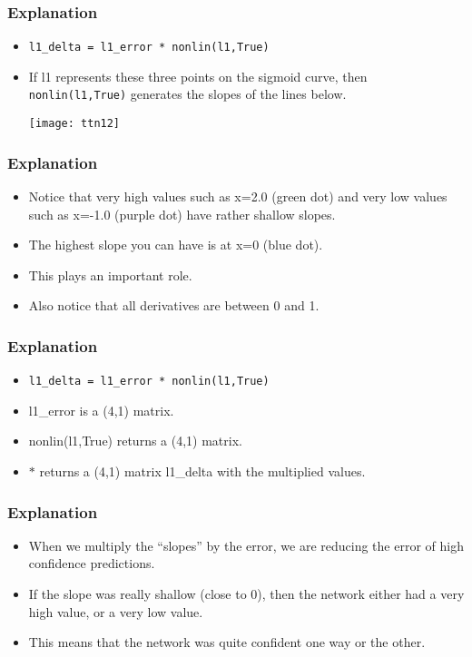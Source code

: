 \begin{frame}[fragile] \frametitle{Explanation}

\begin{itemize}
\item \lstinline|l1_delta = l1_error * nonlin(l1,True)|
\item If l1 represents these three points on the sigmoid curve, then \lstinline|nonlin(l1,True)| generates the slopes of the lines below.
\begin{center}
\texttt{[image: ttn12]}
\end{center}
\end{itemize}
\end{frame}

\begin{frame}[fragile] \frametitle{Explanation}

\begin{itemize}
\item Notice that very high values such as x=2.0 (green dot) and very low values such as x=-1.0 (purple dot) have rather shallow slopes.
\item The highest slope you can have is at x=0 (blue dot). 
\item This plays an important role. 
\item Also notice that all derivatives are between 0 and 1. 
\end{itemize}
\end{frame}

\begin{frame}[fragile] \frametitle{Explanation}

\begin{itemize}
\item \lstinline|l1_delta = l1_error * nonlin(l1,True)|
\item  l1\_error is a (4,1) matrix.
\item nonlin(l1,True) returns a (4,1) matrix. 
\item $*$ returns a (4,1) matrix l1\_delta with the multiplied values. 
\end{itemize}
\end{frame}

\begin{frame}[fragile] \frametitle{Explanation}

\begin{itemize}
\item When we multiply the ``slopes'' by the error, we are reducing the error of high confidence predictions. 
\item If the slope was really shallow (close to 0), then the network either had a very high value, or a very low value. 
\item This means that the network was quite confident one way or the other.
\end{itemize}
\end{frame}

